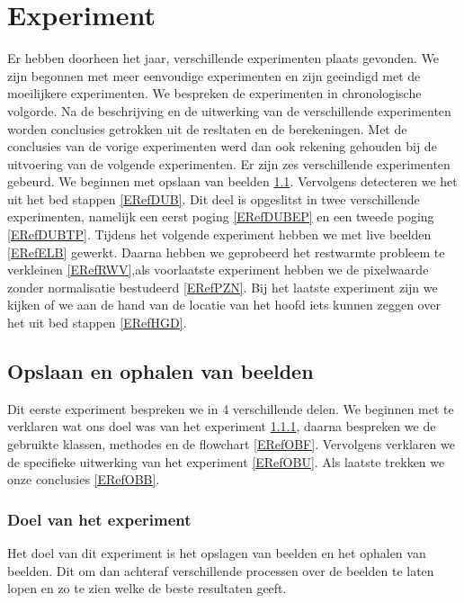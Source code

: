 \chapter{Experiment}
\label{ERef}
Er hebben doorheen het jaar, verschillende experimenten plaats gevonden. We zijn begonnen met meer eenvoudige experimenten en zijn geeindigd met de moeilijkere experimenten. We bespreken de experimenten in chronologische volgorde. Na de beschrijving en de uitwerking van de verschillende experimenten worden conclusies getrokken uit de resltaten en de berekeningen. Met de conclusies van de vorige experimenten werd dan ook rekening gehouden bij de uitvoering van de volgende experimenten. Er zijn zes verschillende experimenten gebeurd. We beginnen met opslaan van beelden \ref{ERefOvB}. Vervolgens detecteren we het uit het bed stappen \ref{ERefDUB}. Dit deel is opgeslitst in twee verschillende experimenten, namelijk een eerst poging \ref{ERefDUBEP} en een tweede poging \ref{ERefDUBTP}. Tijdens het volgende experiment hebben we met live beelden \ref{ERefELB} gewerkt. Daarna hebben we geprobeerd het restwarmte probleem te verkleinen \ref{ERefRWV},als voorlaatste experiment hebben we de pixelwaarde zonder normalisatie bestudeerd \ref{ERefPZN}. Bij het laatste experiment zijn we kijken of we aan de hand van de locatie van het hoofd iets kunnen zeggen over het uit bed stappen \ref{ERefHGD}.

\section{Opslaan en ophalen van beelden}
\label{ERefOvB}
Dit eerste experiment bespreken we in 4 verschillende delen. We beginnen met te verklaren wat ons doel was van het experiment \ref{ERefOBD}, daarna bespreken we de gebruikte klassen, methodes en de flowchart \ref{ERefOBF}. Vervolgens verklaren we de specifieke uitwerking van het experiment \ref{ERefOBU}. Als laatste trekken we onze conclusies \ref{ERefOBB}.

\subsection{Doel van het experiment}
\label{ERefOBD}
Het doel van dit experiment is het opslagen van beelden en het ophalen van beelden. Dit om dan achteraf verschillende processen over de beelden te laten lopen en zo te zien welke de beste resultaten geeft. 

